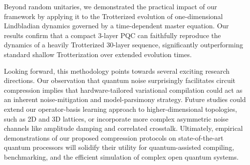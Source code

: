 \documentclass[%
 reprint,
superscriptaddress,
 amsmath,amssymb,
 aps,
]{revtex4-2}
\begin{document}
Beyond random unitaries, we demonstrated the practical impact of our framework by applying it to the Trotterized evolution of one-dimensional Lindbladian dynamics governed by a time-dependent master equation. Our results confirm that a compact 3-layer PQC can faithfully reproduce the dynamics of a heavily Trotterized 30-layer sequence, significantly outperforming standard shallow Trotterization over extended evolution times.

Looking forward, this methodology points towards several exciting research directions. Our observation that quantum noise surprisingly facilitates circuit compression implies that hardware-tailored variational compilation could act as an inherent noise-mitigation and model-parsimony strategy. Future studies could extend our operator-basis learning approach to higher-dimensional topologies, such as 2D and 3D lattices, or incorporate more complex asymmetric noise channels like amplitude damping and correlated crosstalk. Ultimately, empirical demonstrations of our proposed compression protocols on state-of-the-art quantum processors will solidify their utility for quantum-assisted compiling, benchmarking, and the efficient simulation of complex open quantum systems.


\end{document}
